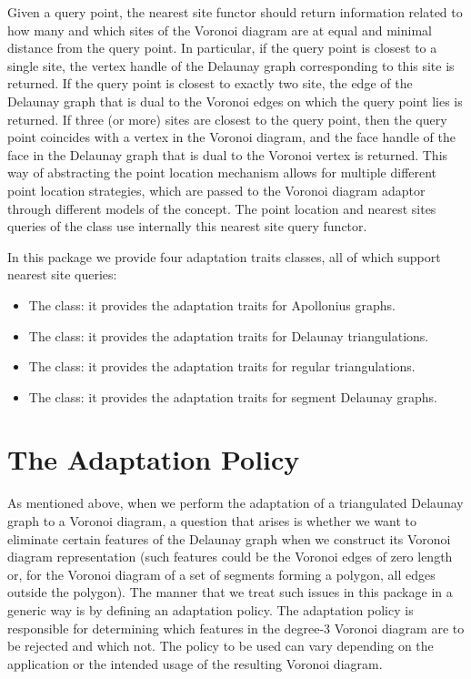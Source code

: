 Given a query point, the nearest site functor should return information 
related to how many and which sites of the Voronoi diagram are at
equal and minimal distance from the query point. In particular, if the
query point is closest to a single site, the vertex handle of the
Delaunay graph corresponding to this site is returned. If the
query point is closest to exactly two site, the edge of the
Delaunay graph that is dual to the Voronoi edges on which the query
point lies is returned. If three (or more) sites are closest to
the query point, then the query point coincides with a vertex in the
Voronoi diagram, and the face handle of the face in the Delaunay graph
that is dual to the Voronoi vertex is returned.
This way of abstracting the point location mechanism allows
for multiple different point location strategies, which are passed to
the Voronoi diagram adaptor through different models of the
 concept. The point location and nearest sites
queries of the  class use internally
this nearest site query functor.

In this package we provide four adaptation traits classes, all of which
support nearest site queries:
\begin{itemize}
\item
  The  class: it
  provides the adaptation traits for Apollonius graphs.
\item
  The  class: it
  provides the adaptation traits for Delaunay triangulations.
\item
  The  class: it
  provides the adaptation traits for regular triangulations.
\item
  The  class: it
  provides the adaptation traits for segment Delaunay graphs.
\end{itemize}

\section{The Adaptation Policy\label{sec:vda2-ap}}

As mentioned above, when we perform the adaptation of a triangulated
Delaunay graph to a Voronoi diagram, a question that arises is whether
we want to eliminate certain features of the Delaunay graph when we
construct its Voronoi diagram representation (such features could be
the Voronoi edges of zero length or, for the Voronoi diagram of a set
of segments forming a polygon, all edges outside the polygon).
The manner that we treat such issues in this package in a generic way
is by defining an adaptation policy. The adaptation policy is
responsible for determining which features in the degree-3 Voronoi
diagram are to be rejected and which not. The policy to be used can
vary depending on the application or the intended usage of the
resulting Voronoi diagram.

